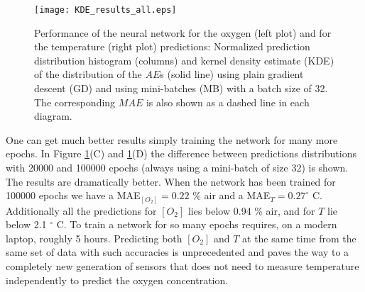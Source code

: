 \documentclass[9pt,twocolumn,twoside,pdftex]{optica}
\begin{document}
\begin{figure}[htbp]
\centering
\texttt{[image: KDE\_results\_all.eps]}
\caption{Performance of the neural network for the oxygen (left plot) and for the temperature (right plot) predictions: Normalized prediction distribution histogram (columns) and kernel density estimate (KDE) of the distribution of the $AE$s (solid line) using plain gradient descent (GD) and using mini-batches (MB) with a batch size of 32. The corresponding $MAE$ is also shown as a dashed line in each diagram.}
\label{fig:KDE_results_all}
\end{figure}


One can get much better results simply training the network for many more epochs. In Figure \ref{fig:KDE_results_all}(C) and \ref{fig:KDE_results_all}(D) the difference between predictions distributions with 20000 and 100000 epochs (always using a mini-batch of size 32) is shown. The results are dramatically better. When the network has been trained for 100000 epochs we have a MAE$_{[O_2]}=0.22$ \% air and a MAE$_{T}=0.27^\circ$ C. Additionally all the predictions for $[O_2]$ lies below 0.94 \% air, and for $T$ lie below 2.1 $^\circ$ C. To train a network for so many epochs requires, on a modern laptop, roughly 5 hours. Predicting both $[O_2]$ and $T$ at the same time from the same set of data with such accuracies is unprecedented and paves the way to a completely new generation of sensors that does not need to measure temperature independently to predict the oxygen concentration.

\end{document}
